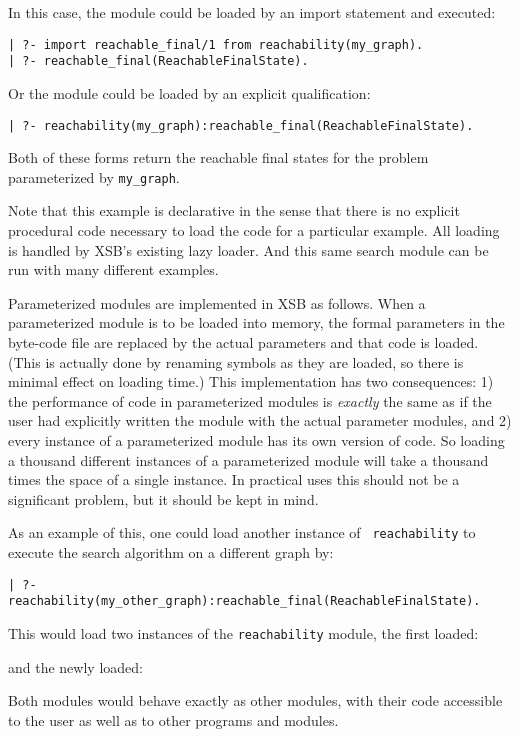 In this case, the module could be loaded by an import statement and
executed:
\begin{verbatim}
| ?- import reachable_final/1 from reachability(my_graph).
| ?- reachable_final(ReachableFinalState).
\end{verbatim}
Or the module could be loaded by an explicit qualification:
\begin{verbatim}
| ?- reachability(my_graph):reachable_final(ReachableFinalState).
\end{verbatim}
Both of these forms return the reachable final states for the problem
parameterized by {\tt my\_graph}.

Note that this example is declarative in the sense that there is no
explicit procedural code necessary to load the code for a particular
example.  All loading is handled by XSB's existing lazy loader.  And
this same search module can be run with many different examples.

Parameterized modules are implemented in XSB as follows.  When a
parameterized module is to be loaded into memory, the formal
parameters in the byte-code file are replaced by the actual parameters
and that code is loaded.  (This is actually done by renaming symbols
as they are loaded, so there is minimal effect on loading time.)  This
implementation has two consequences: 1) the performance of code in
parameterized modules is {\em exactly} the same as if the user had
explicitly written the module with the actual parameter modules, and
2) every instance of a parameterized module has its own version of
code.  So loading a thousand different instances of a parameterized
module will take a thousand times the space of a single instance.  In
practical uses
this should not be a significant problem, but it should be kept in
mind.

As an example of this, one could load another instance of {\tt
  reachability} to execute the search algorithm on a different graph
by:
\begin{verbatim}
| ?- reachability(my_other_graph):reachable_final(ReachableFinalState).
\end{verbatim}
This would load two instances of the {\tt reachability} module, the
first loaded:


\noindent
and the newly loaded:


\noindent
Both modules would behave exactly as other modules, with their code
accessible to the user as well as to other programs and modules.

